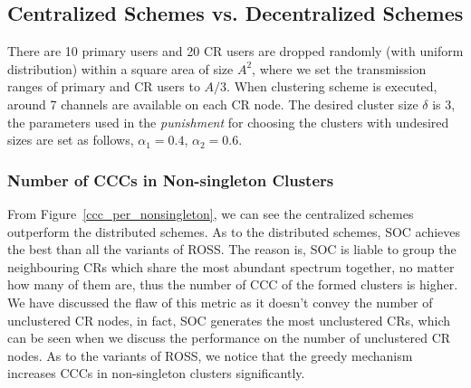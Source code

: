 \documentclass[10pt,journal,compsoc]{IEEEtran}
\theoremstyle{mytheoremstyle}
\theoremstyle{mytheoremstyle}
\theoremstyle{mytheoremstyle}
\begin{document}
\subsection{Centralized Schemes vs. Decentralized Schemes}
There are 10 primary users and 20 CR users are dropped randomly (with uniform distribution) within a square area of size $A^{2}$, where we set the transmission ranges of primary and CR users to $A/3$.
When clustering scheme is executed, around 7 channels are available on each CR node.
The desired cluster size $\delta$ is 3, the parameters used in the \textit{punishment} for choosing the clusters with undesired sizes are set as follows, $\alpha_1 =  0.4$, $\alpha_2 =  0.6$.


\subsubsection{Number of CCCs in Non-singleton Clusters}
\label{ccc_20}
From Figure~\ref{ccc_per_nonsingleton}, we can see the centralized schemes outperform the distributed schemes.
As to the distributed schemes, SOC achieves the best than all the variants of ROSS.
The reason is, SOC is liable to group the neighbouring CRs which share the most abundant spectrum together, no matter how many of them are, thus the number of CCC of the formed clusters is higher.
We have discussed the flaw of this metric as it doesn't convey the number of unclustered CR nodes, in fact, SOC generates the most unclustered CRs, which can be seen when we discuss the performance on the number of unclustered CR nodes. 
As to the variants of ROSS, we notice that the greedy mechanism increases CCCs in non-singleton clusters significantly.
\end{document}
